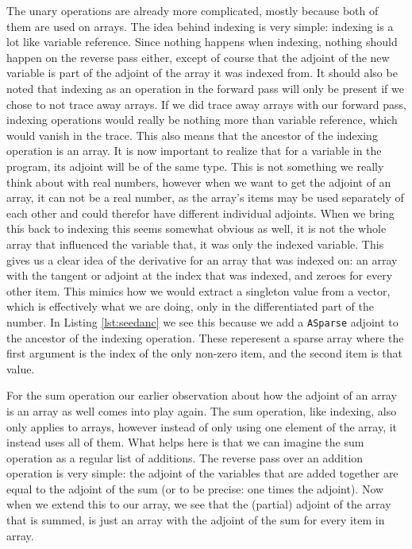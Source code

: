         The unary operations are already more complicated, mostly because both of them are used on arrays.
        The idea behind indexing is very simple: indexing is a lot like variable reference.
        Since nothing happens when indexing, nothing should happen on the reverse pass either, except of course that the adjoint of the new variable is part of the adjoint of the array it was indexed from.
        It should also be noted that indexing as an operation in the forward pass will only be present if we chose to not trace away arrays.
        If we did trace away arrays with our forward pass, indexing operations would really be nothing more than variable reference, which would vanish in the trace.
        This also means that the ancestor of the indexing operation is an array.
        It is now important to realize that for a variable in the program, its adjoint will be of the same type.
        This is not something we really think about with real numbers, however when we want to get the adjoint of an array, it can not be a real number, as the array's items may be used separately of each other and could therefor have different individual adjoints.
        When we bring this back to indexing this seems somewhat obvious as well, it is not the whole array that influenced the variable that, it was only the indexed variable.
        This gives us a clear idea of the derivative for an array that was indexed on: an array with the tangent or adjoint at the index that was indexed, and zeroes for every other item.
        This mimics how we would extract a singleton value from a vector, which is effectively what we are doing, only in the differentiated part of the number.
        In Listing \ref{lst:seedanc} we see this because we add a \texttt{ASparse} adjoint to the ancestor of the indexing operation.
        These reperesent a sparse array where the first argument is the index of the only non-zero item, and the second item is that value.

        For the sum operation our earlier observation about how the adjoint of an array is an array as well comes into play again.
        The sum operation, like indexing, also only applies to arrays, however instead of only using one element of the array, it instead uses all of them.
        What helps here is that we can imagine the sum operation as a regular list of additions.
        The reverse pass over an addition operation is very simple: the adjoint of the variables that are added together are equal to the adjoint of the sum (or to be precise: one times the adjoint).
        Now when we extend this to our array, we see that the (partial) adjoint of the array that is summed, is just an array with the adjoint of the sum for every item in array.

